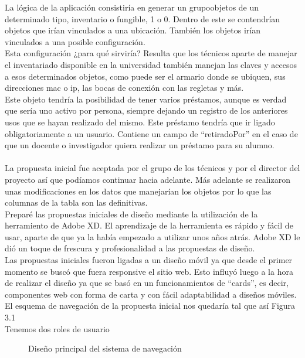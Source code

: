 La lógica de la aplicación consistiría en generar un grupoobjetos de un determinado tipo, inventario o fungible, 1 o 0. Dentro de este se contendrían objetos que irían vinculados a una ubicación. También los objetos irían vinculados a una posible configuración.
\\Esta configuración ¿para qué sirviría? Resulta que los técnicos aparte de manejar el inventariado disponible en la universidad también manejan las claves y accesos a esos determinados objetos, como puede ser el armario donde se ubiquen, sus direcciones mac o ip, las bocas de conexión con las regletas y más.
\\Este objeto tendría la posibilidad de tener varios préstamos, aunque es verdad que sería uno activo por persona, siempre dejando un registro de los anteriores usos que se hayan realizado del mismo. Este préstamo tendría que ir ligado obligatoriamente a un usuario. Contiene un campo de ``retiradoPor'' en el caso de que un docente o investigador quiera realizar un préstamo para su alumno.
\\\\La propuesta inicial fue aceptada por el grupo de los técnicos y por el director del proyecto así que podíamos continuar hacia adelante. Más adelante se realizaron unas modificaciones en los datos que manejarían los objetos por lo que las columnas de la tabla son las definitivas.
\\Preparé las propuestas iniciales de diseño mediante la utilización de la herramiento de Adobe XD. El aprendizaje de la herramienta es rápido y fácil de usar, aparte de que ya la había empezado a utilizar unos años atrás. Adobe XD le dió un toque de frescura y profesionalidad a las propuestas de diseño.
\\Las propuestas iniciales fueron ligadas a un diseño móvil ya que desde el primer momento se buscó que fuera responsive el sitio web. Esto influyó luego a la hora de realizar el diseño ya que se basó en un funcionamientos de ``cards'', es decir, componentes web con forma de carta y con fácil adaptabilidad a diseños móviles.
\\El esquema de navegación de la propuesta inicial nos quedaría tal que así Figura 3.1
\\Tenemos dos roles de usuario

\begin{figure}
    \caption{Diseño principal del sistema de navegación}
\end{figure}

